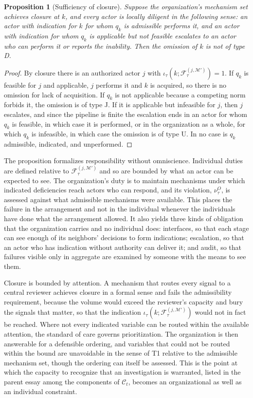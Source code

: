 \documentclass[11pt]{article}
\newcommand{\F}{\mathcal F}
\newcommand{\C}{\mathcal C}
\newcommand{\M}{\mathcal M}
\theoremstyle{plain}
\newtheorem{proposition}{Proposition}
\theoremstyle{definition}
\begin{document}
\begin{proposition}[Sufficiency of closure]\label{prop:closure}
Suppose the organization's mechanism set achieves closure at $k$, and every actor is locally diligent in the following sense: an actor with indication for $k$ for whom $q_k$ is admissible performs it, and an actor with indication for whom $q_k$ is applicable but not feasible escalates to an actor who can perform it or reports the inability. Then the omission of $k$ is not of type D.
\end{proposition}

\begin{proof}
By closure there is an authorized actor $j$ with $\iota_\tau(k;\F^{(j,\M')}_\tau)=1$. If $q_k$ is feasible for $j$ and applicable, $j$ performs it and $k$ is acquired, so there is no omission for lack of acquisition. If $q_k$ is not applicable because a competing norm forbids it, the omission is of type J. If it is applicable but infeasible for $j$, then $j$ escalates, and since the pipeline is finite the escalation ends in an actor for whom $q_k$ is feasible, in which case it is performed, or in the organization as a whole, for which $q_k$ is infeasible, in which case the omission is of type U. In no case is $q_k$ admissible, indicated, and unperformed.
\end{proof}

The proposition formalizes responsibility without omniscience. Individual duties are defined relative to $\F^{(j,\M')}_\tau$ and so are bounded by what an actor can be expected to see. The organization's duty is to maintain mechanisms under which indicated deficiencies reach actors who can respond, and its violation, $\nu^{O}_\tau$, is assessed against what admissible mechanisms were available. This places the failure in the arrangement and not in the individual whenever the individuals have done what the arrangement allowed. It also yields three kinds of obligation that the organization carries and no individual does: interfaces, so that each stage can see enough of its neighbors' decisions to form indications; escalation, so that an actor who has indication without authority can deliver it; and audit, so that failures visible only in aggregate are examined by someone with the means to see them.

Closure is bounded by attention. A mechanism that routes every signal to a central reviewer achieves closure in a formal sense and fails the admissibility requirement, because the volume would exceed the reviewer's capacity and bury the signals that matter, so that the indication $\iota_\tau(k;\F^{(j,\M')}_\tau)$ would not in fact be reached. Where not every indicated variable can be routed within the available attention, the standard of care governs prioritization. The organization is then answerable for a defensible ordering, and variables that could not be routed within the bound are unavoidable in the sense of T1 relative to the admissible mechanism set, though the ordering can itself be assessed. This is the point at which the capacity to recognize that an investigation is warranted, listed in the parent essay among the components of $\C_t$, becomes an organizational as well as an individual constraint.
\end{document}
